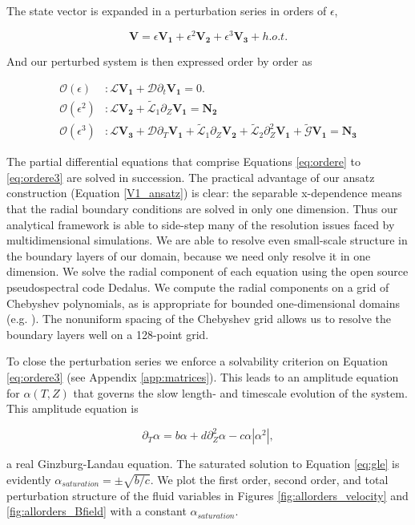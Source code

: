 \documentclass{emulateapj}
\newcommand{\beq}{\begin{equation}}
\newcommand{\eeq}{\end{equation}}
\newcommand{\citei}[1]{\citeauthor{#1} \citeyear{#1}}
\begin{document}
The state vector is expanded in a perturbation series in orders of $\epsilon$,

\beq
\label{eq:pert_exp}
\mathbf{V} = \epsilon\mathbf{V_1} + \epsilon^2\mathbf{V_2} + \epsilon^3\mathbf{V_3} + h.o.t.
\eeq

And our perturbed system is then expressed order by order as

\begin{align}
\mathcal{O}(\epsilon)&: \mathcal{L}\mathbf{V_1} + \mathcal{D}\partial_t \mathbf{V_1} = 0. \label{eq:ordere}\\
\mathcal{O}(\epsilon^2)&: \mathcal{L}\mathbf{V_2} + \widetilde{\mathcal{L}}_1 \partial_Z \mathbf{V_1} = \mathbf{N_2} \label{eq:ordere2}\\
\mathcal{O}(\epsilon^3)&: \mathcal{L} \mathbf{V_3} + \mathcal{D}\partial_T \mathbf{V_1}  + \widetilde{\mathcal{L}}_1\partial_Z\mathbf{V_2} + \widetilde{\mathcal{L}}_2\partial_Z^2\mathbf{V_1} + \widetilde{\mathcal{G}}\mathbf{V_1} = \mathbf{N_3} \label{eq:ordere3}
\end{align}

The partial differential equations that comprise Equations \ref{eq:ordere} to \ref{eq:ordere3} are solved in succession. The practical advantage of our ansatz construction (Equation \ref{V1_ansatz}) is clear: the separable x-dependence means that the radial boundary conditions are solved in only one dimension. Thus our analytical framework is able to side-step many of the resolution issues faced by multidimensional simulations. We are able to resolve even small-scale structure in the boundary layers of our domain, because we need only resolve it in one dimension. We solve the radial component of each equation using the open source pseudospectral code Dedalus. We compute the radial components on a grid of Chebyshev polynomials, as is appropriate for bounded one-dimensional domains (e.g. \citei{Boyd:2001aa}). The nonuniform spacing of the Chebyshev grid allows us to resolve the boundary layers well on a 128-point grid.

To close the perturbation series we enforce a solvability criterion on Equation \ref{eq:ordere3} (see Appendix \ref{app:matrices}). This leads to an amplitude equation for $\alpha(T, Z)$ that governs the slow length- and timescale evolution of the system. This amplitude equation is 

\beq
\label{eq:gle}
\partial_T \alpha = b \alpha + d \partial_Z^2 \alpha - c \alpha \left|\alpha^2\right|,
\eeq

a real Ginzburg-Landau equation. The saturated solution to Equation \ref{eq:gle} is evidently $\alpha_{saturation} = \pm \sqrt{b/c}$. We plot the first order, second order, and total perturbation structure of the fluid variables in Figures \ref{fig:allorders_velocity} and \ref{fig:allorders_Bfield} with a constant $\alpha_{saturation}$.  
\end{document}
